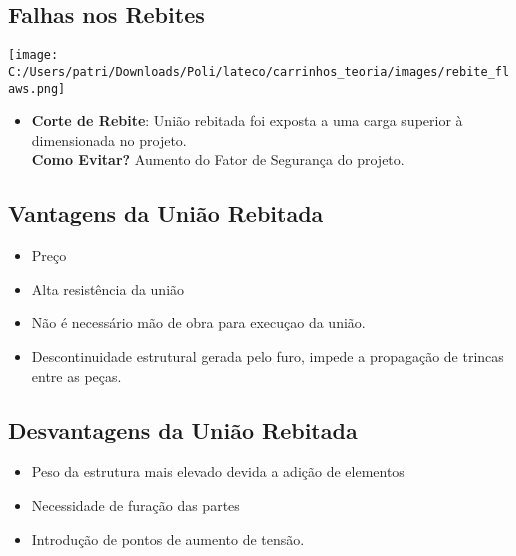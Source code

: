 \subsection{Falhas nos Rebites}

\begin{center}
\texttt{[image: C:/Users/patri/Downloads/Poli/lateco/carrinhos\_teoria/images/rebite\_flaws.png]}  
\end{center}

\begin{itemize}
	\item \textbf{Corte de Rebite}: União rebitada foi exposta a uma carga superior à dimensionada no projeto.\\ \textbf{Como Evitar?} Aumento do Fator de Segurança do projeto.
\end{itemize}

\subsection{Vantagens da União Rebitada}

\begin{itemize}
	\item Preço
	\item Alta resistência da união
	\item Não é necessário mão de obra para execuçao da união.
	\item Descontinuidade estrutural gerada pelo furo, impede a propagação de trincas entre as peças.
\end{itemize}

\subsection{Desvantagens da União Rebitada}

\begin{itemize}
	\item Peso da estrutura mais elevado devida a adição de elementos
	\item Necessidade de furação das partes
	\item Introdução de pontos de aumento de tensão.
\end{itemize}